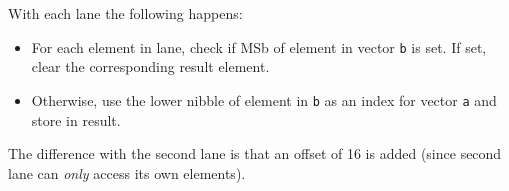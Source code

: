 With each lane the following happens:

\begin{itemize}
  \item For each element in lane, check if MSb of element in vector \texttt{b}
        is set. If set, clear the corresponding result element.
  \item Otherwise, use the lower nibble of element in \texttt{b} as an index
        for vector \texttt{a} and store in result.
\end{itemize}

The difference with the second lane is that an offset of 16 is added (since
second lane can \textit{only} access its own elements).
